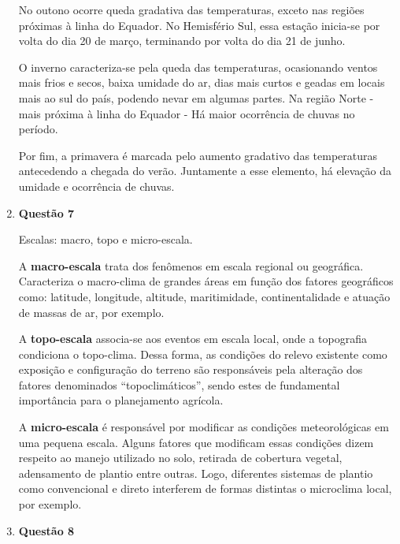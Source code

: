 \documentclass[a4paper, 12pt]{article}
\begin{document}
\begin{enumerate}
		\hspace{1cm}No outono ocorre queda gradativa das temperaturas, exceto nas regiões próximas à linha do Equador. No Hemisfério Sul, essa estação inicia-se por volta do dia 20 de março, terminando por volta do dia 21 de junho.
		
		\hspace{1cm}O inverno caracteriza-se pela queda das temperaturas, ocasionando ventos mais frios e secos, baixa umidade do ar, dias mais curtos e geadas em locais mais ao sul do país, podendo nevar em algumas partes. Na região Norte - mais próxima à linha do Equador - Há maior ocorrência de chuvas no período.
		
		\hspace{1cm}Por fim, a primavera é marcada pelo aumento gradativo das temperaturas antecedendo a chegada do verão. Juntamente a esse elemento, há elevação da umidade e ocorrência de chuvas.
		
		\item[]\textbf{Questão 7} 
		
		\hspace{1cm}Escalas: macro, topo e micro-escala.
		
		\hspace{1cm}A \textbf{macro-escala} trata dos fenômenos em escala regional ou geográfica. Caracteriza o macro-clima de grandes áreas em função dos fatores geográficos como: latitude, longitude, altitude, maritimidade, continentalidade e atuação de massas de ar, por exemplo.
		
		\hspace{1cm}A \textbf{topo-escala} associa-se aos eventos em escala local, onde a topografia condiciona o topo-clima. Dessa forma, as condições do relevo existente como exposição e configuração do terreno são responsáveis pela alteração dos fatores denominados ``topoclimáticos'', sendo estes de fundamental importância para o planejamento agrícola.
		
		\hspace{1cm} A \textbf{micro-escala} é responsável por modificar as condições meteorológicas em uma pequena escala. Alguns fatores que modificam essas condições dizem respeito ao manejo utilizado no solo, retirada de cobertura vegetal, adensamento de plantio entre outras. Logo, diferentes sistemas de plantio como convencional e direto interferem de formas distintas o microclima local, por exemplo.
		
		\item[]\textbf{Questão 8}
		

\end{enumerate}
\end{document}
